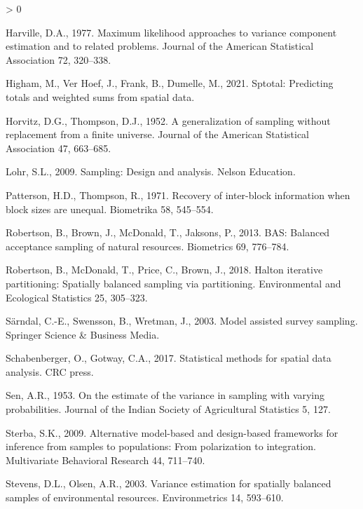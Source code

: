 \documentclass[]{elsarticle} %
\newlength{\cslhangindent}
\newenvironment{CSLReferences}[2] %
 {%
  \setlength{\parindent}{0pt}
  \ifodd #1 \everypar{\setlength{\hangindent}{\cslhangindent}}\ignorespaces\fi
  \ifnum #2 > 0
  \setlength{\parskip}{#2\baselineskip}
  \fi
 }%
 {}
\begin{document}
\begin{CSLReferences}{1}{0}
\leavevmode\hypertarget{ref-harville1977maximum}{}%
Harville, D.A., 1977. Maximum likelihood approaches to variance
component estimation and to related problems. Journal of the American
Statistical Association 72, 320--338.

\leavevmode\hypertarget{ref-higham2021sptotal}{}%
Higham, M., Ver Hoef, J., Frank, B., Dumelle, M., 2021. Sptotal:
Predicting totals and weighted sums from spatial data.

\leavevmode\hypertarget{ref-horvitz1952generalization}{}%
Horvitz, D.G., Thompson, D.J., 1952. A generalization of sampling
without replacement from a finite universe. Journal of the American
Statistical Association 47, 663--685.

\leavevmode\hypertarget{ref-lohr2009sampling}{}%
Lohr, S.L., 2009. Sampling: Design and analysis. Nelson Education.

\leavevmode\hypertarget{ref-patterson1971recovery}{}%
Patterson, H.D., Thompson, R., 1971. Recovery of inter-block information
when block sizes are unequal. Biometrika 58, 545--554.

\leavevmode\hypertarget{ref-robertson2013bas}{}%
Robertson, B., Brown, J., McDonald, T., Jaksons, P., 2013. BAS: Balanced
acceptance sampling of natural resources. Biometrics 69, 776--784.

\leavevmode\hypertarget{ref-robertson2018halton}{}%
Robertson, B., McDonald, T., Price, C., Brown, J., 2018. Halton
iterative partitioning: Spatially balanced sampling via partitioning.
Environmental and Ecological Statistics 25, 305--323.

\leavevmode\hypertarget{ref-sarndal2003model}{}%
Särndal, C.-E., Swensson, B., Wretman, J., 2003. Model assisted survey
sampling. Springer Science \& Business Media.

\leavevmode\hypertarget{ref-schabenberger2017statistical}{}%
Schabenberger, O., Gotway, C.A., 2017. Statistical methods for spatial
data analysis. CRC press.

\leavevmode\hypertarget{ref-sen1953estimate}{}%
Sen, A.R., 1953. On the estimate of the variance in sampling with
varying probabilities. Journal of the Indian Society of Agricultural
Statistics 5, 127.

\leavevmode\hypertarget{ref-sterba2009alternative}{}%
Sterba, S.K., 2009. Alternative model-based and design-based frameworks
for inference from samples to populations: From polarization to
integration. Multivariate Behavioral Research 44, 711--740.

\leavevmode\hypertarget{ref-stevens2003variance}{}%
Stevens, D.L., Olsen, A.R., 2003. Variance estimation for spatially
balanced samples of environmental resources. Environmetrics 14,
593--610.


\end{CSLReferences}
\end{document}
